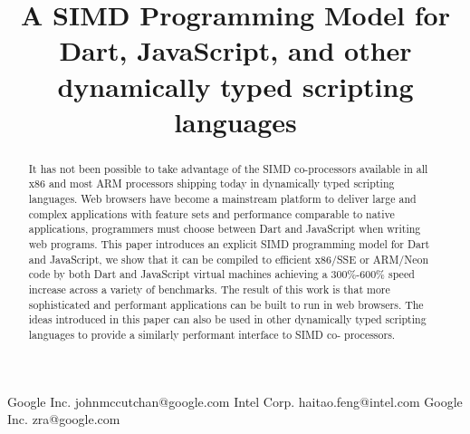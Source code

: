 \documentclass[preprint]{sigplanconf}
\begin{document}
\setlength{\pdfpageheight}{\paperheight}
\setlength{\pdfpagewidth}{\paperwidth}






\title{A SIMD Programming Model for Dart, JavaScript, and other dynamically typed scripting languages}

           {Google Inc.}
           {johnmccutchan@google.com}
           {Intel Corp.}
           {haitao.feng@intel.com}
           {Google Inc.}
           {zra@google.com}

\maketitle

\begin{abstract}

It has not been possible to take advantage of the SIMD co-processors available
in all x86 and most ARM processors shipping today in dynamically typed scripting
languages. Web browsers have become a mainstream platform to deliver large and
complex applications with feature sets and performance comparable to native
applications, programmers must choose between Dart and JavaScript when writing
web programs. This paper introduces an explicit SIMD programming model for Dart
and JavaScript, we show that it can be compiled to efficient x86/SSE or ARM/Neon
code by both Dart and JavaScript virtual machines achieving a 300\%-600\% speed
increase across a variety of benchmarks. The result of this work is that more
sophisticated and performant applications can be built to run in web browsers.
The ideas introduced in this paper can also be used in other dynamically typed
scripting languages to provide a similarly performant interface to SIMD co-
processors.

\end{abstract}
\end{document}
